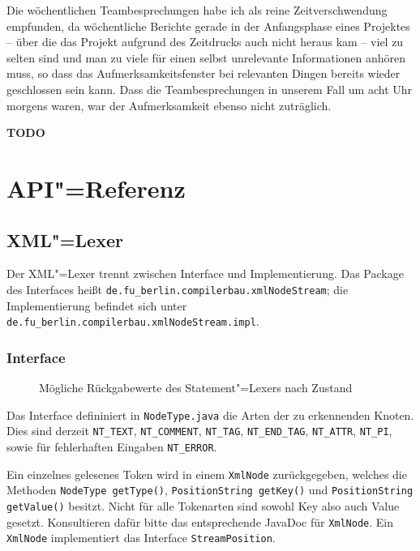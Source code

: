 \documentclass[10pt,a4paper,ngerman,titlepage,tocindentauto]{scrartcl}
\newcommand{\TODO}{ {\LARGE\bf\color{crimson} TODO} }
\newcommand{\n}{\linebreak[1]}
\begin{document}
		Die wöchentlichen Teambesprechungen habe ich als reine Zeitverschwendung empfunden, da wöchentliche
		Berichte gerade in der Anfangsphase eines Projektes -- über die das Projekt aufgrund des Zeitdrucks
		auch nicht heraus kam -- viel zu selten sind und man zu viele für einen selbst unrelevante Informationen
		anhören muss, so dass das Aufmerksamkeitsfenster bei relevanten Dingen bereits wieder geschlossen
		sein kann. Dass die Teambesprechungen in unserem Fall um acht Uhr morgens waren, war der Aufmerksamkeit
		ebenso nicht zuträglich.
		
		\TODO
		
	\section{API"=Referenz}
		\subsection[XML-Lexer]{\hypertarget{XML-Lexer-API}{XML"=Lexer}}
			Der XML"=Lexer trennt zwischen Interface und Implementierung.
			Das Package des Interfaces heißt \texttt{de.{\n}fu\_berlin.{\n}compilerbau.{\n}xmlNodeStream};
			die Implementierung befindet sich unter \texttt{de.{\n}fu\_berlin.{\n}compilerbau.{\n}xmlNodeStream.{\n}impl}.
			
			\subsubsection*{Interface}
				\begin{wrapfigure}{R}{0.3\textwidth}
					\vspace{-22pt}
					\caption{Mög\-li\-che Rück\-ga\-be\-wer\-te des State\-ment"=Le\-xers nach Zu\-stand}
					\vspace{-30pt}
				\end{wrapfigure}
				
				Das Interface defininiert in \texttt{NodeType.java} die Arten der zu erkennenden Knoten.
				Dies sind derzeit \texttt{NT\_TEXT}, \texttt{NT\_COMMENT}, \texttt{NT\_TAG}, \texttt{NT\_END\_TAG},
				\texttt{NT\_ATTR}, \texttt{NT\_PI}, sowie für fehlerhaften Eingaben \texttt{NT\_ERROR}.
				
				Ein einzelnes gelesenes Token wird in einem \texttt{XmlNode} zurückgegeben, welches die Methoden
				\texttt{NodeType getType()}, \texttt{PositionString getKey()} und \texttt{PositionString getValue()}
				besitzt. Nicht für alle Tokenarten sind sowohl Key also auch Value gesetzt. Konsultieren dafür
				bitte das entsprechende JavaDoc für \texttt{XmlNode}. Ein \texttt{XmlNode} implementiert das Interface
				\texttt{StreamPosition}.
				
\end{document}
